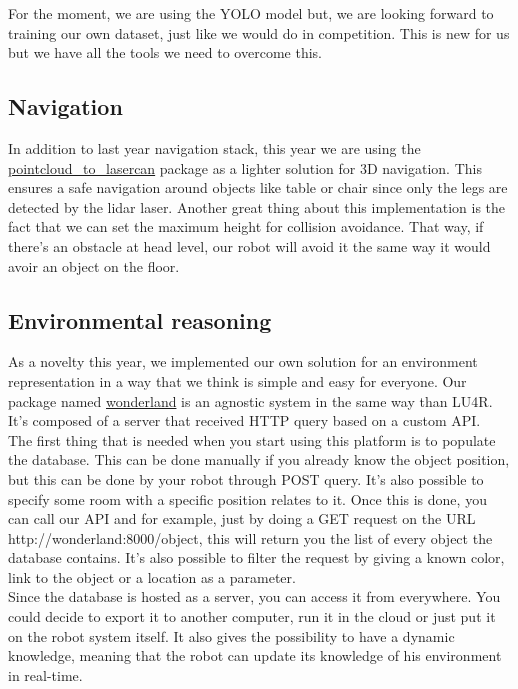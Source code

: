 \documentclass[runningheads,a4paper]{llncs}
\begin{document}
For the moment, we are using the YOLO model but, we are looking forward to training our own dataset, just like we would do in competition. This is new for us but we have all the tools we need to overcome this. \\

\subsection{Navigation}
\tab In addition to last year navigation stack, this year we are using the \href{http://wiki.ros.org/pointcloud_to_laserscan}{pointcloud\_to\_lasercan} package as a lighter solution for 3D navigation. This ensures a safe navigation around objects like table or chair since only the legs are detected by the lidar laser. Another great thing about this implementation is the fact that we can set the maximum height for collision avoidance. That way, if there’s an obstacle at head level, our robot will avoid it the same way it would avoir an object on the floor. \\

\subsection{Environmental reasoning}
\tab As a novelty this year, we implemented our own solution for an environment representation in a way that we think is simple and easy for everyone. Our package named \href{http://github.com/walkingmachine/wonderland}{wonderland} is an agnostic system in the same way than LU4R. It’s composed of a server that received HTTP query based on a custom API. \\

The first thing that is needed when you start using this platform is to populate the database. This can be done manually if you already know the object position, but this can be done by your robot through POST query. It’s also possible to specify some room with a specific position relates to it. Once this is done, you can call our API and for example, just by doing a GET request on the URL http://wonderland:8000/object, this will return you the list of every object the database contains. It’s also possible to filter the request by giving a known color, link to the object or a location as a parameter. \\

Since the database is hosted as a server, you can access it from everywhere. You could decide to export it to another computer, run it in the cloud or just put it on the robot system itself. It also gives the possibility to have a dynamic knowledge, meaning that the robot can update its knowledge of his environment in real-time. \\
\end{document}
